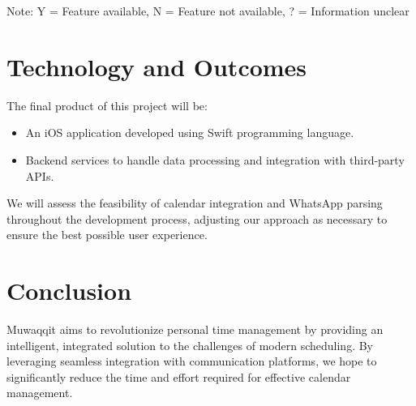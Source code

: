 \documentclass[12pt,a4paper]{article}
\begin{document}
\noindent
Note: Y = Feature available, N = Feature not available, ? = Information unclear

\section{Technology and Outcomes}

The final product of this project will be:

\begin{itemize}
    \item An iOS application developed using Swift programming language.
    \item Backend services to handle data processing and integration with third-party APIs.
\end{itemize}

We will assess the feasibility of calendar integration and WhatsApp parsing throughout the development process, adjusting our approach as necessary to ensure the best possible user experience.

\section{Conclusion}

Muwaqqit aims to revolutionize personal time management by providing an intelligent, integrated solution to the challenges of modern scheduling. By leveraging seamless integration with communication platforms, we hope to significantly reduce the time and effort required for effective calendar management.

\newpage

 

\end{document}
